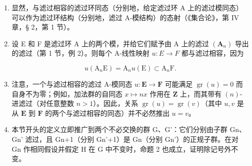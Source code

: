 \begin{enumerate}
\def\labelenumi{(\arabic{enumi})}
\item
  显然，与滤过相容的滤过环同态（分别地，给定滤过环 A 上的滤过模同态）可以作为滤过环结构（分别地，滤过 A-模结构）的态射（《集合论》，第 IV 章，§ 2，第 1 节）。
\item
  设 E 和 F 是滤过环 A 上的两个模，并给它们赋予由 A 上的滤过 \((\mathbf{A}_{n})\) 导出的滤过（第 1 节，例 2）。则每个 A-线性映射 \(u: E \rightarrow F\) 都与滤过相容，因为

\[
u (\mathrm{A} _ {n} \mathrm{E}) = \mathrm{A} _ {n} u (\mathrm{E}) \subset \mathrm{A} _ {n} \mathrm{F}.
\]

\item
	  注意，一个与滤过相容的滤过 A-模同态 \(u: \mathbf{E} \to \mathbf{F}\) 可能满足 \(\operatorname{gr}(u) = 0\) 而自身不为零；例如，加法群的自同态 \(x \mapsto nx\) 作用在 \(\mathbf{Z}\) 上，而其带有 \((n)\)-进滤过（对任意整数 \(n > 1\)）。因此，关系 \(\operatorname{gr}(u) = \operatorname{gr}(v)\)（其中 \(u, v\) 是从 \(\mathbf{E}\) 到 \(\mathbf{F}\) 的两个与滤过相容的同态）并不必然推出 \(u = v\)。
\item
  本节开头的定义立即推广到两个不必交换的群 G、G'：它们分别由子群 Gn、Gn' 滤过，且 Gn+1（分别 Gn'+1）是 Gn（分别 Gn'）的正规子群。在对 Gn 作相同假设并假定 H 在 G 中不变时，命题 2 也成立，证明除记号外不变。
\end{enumerate}

